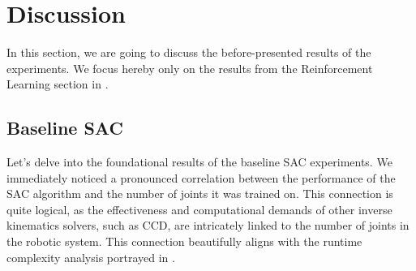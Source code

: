 \chapter{Discussion}\label{chap:discussion}

In this section, we are going to discuss the before-presented results of the experiments. We focus hereby only on the results from the Reinforcement Learning section in .

\section{Baseline SAC}


Let's delve into the foundational results of the baseline SAC experiments. We immediately noticed a pronounced correlation between the performance of the SAC algorithm and the number of joints it was trained on. This connection is quite logical, as the effectiveness and computational demands of other inverse kinematics solvers, such as CCD, are intricately linked to the number of joints in the robotic system. This connection beautifully aligns with the runtime complexity analysis portrayed in .


